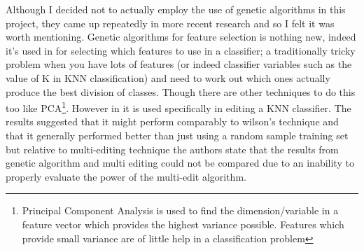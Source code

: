 Although I decided not to actually employ the use of genetic algorithms in this project, they came up repeatedly in more recent research and so I felt it was worth mentioning. Genetic algorithms for feature selection is nothing new, indeed it's used in \cite{fujinaga1996adaptive} for selecting which features to use in a classifier; a traditionally tricky problem when you have lots of features (or indeed classifier variables such as the value of K in KNN classification) and need to work out which ones actually produce the best division of classes. Though there are other techniques to do this too like PCA\footnote{Principal Component Analysis is used to find the dimension/variable in a feature vector which provides the highest variance possible. Features which provide small variance are of little help in a classification problem}. However in \cite{kuncheva1995editing} it is used specifically in editing a KNN classifier. The results suggested that it might perform comparably to wilson's technique and that it generally performed better than just using a random sample training set but relative to multi-editing technique the authors state that the results from genetic algorithm and multi editing could not be compared due to an inability to properly evaluate the power of the multi-edit algorithm.